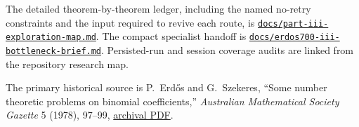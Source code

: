 \documentclass[11pt]{article}
\begin{document}
The detailed theorem-by-theorem ledger, including the named no-retry
constraints and the input required to revive each route, is
\href{https://github.com/gakonst/nanocodex-erdos700/blob/main/docs/part-iii-exploration-map.md}
{\texttt{docs/part-iii-exploration-map.md}}.  The compact specialist handoff is
\href{https://github.com/gakonst/nanocodex-erdos700/blob/main/docs/erdos700-iii-bottleneck-brief.md}
{\texttt{docs/erdos700-iii-bottleneck-brief.md}}.  Persisted-run and session
coverage audits are linked from the repository research map.

The primary historical source is P.~Erd\H{o}s and G.~Szekeres,
``Some number theoretic problems on binomial coefficients,''
\emph{Australian Mathematical Society Gazette} 5 (1978), 97--99,
\href{https://www.renyi.hu/~p_erdos/1978-46.pdf}{archival PDF}.
\end{document}
